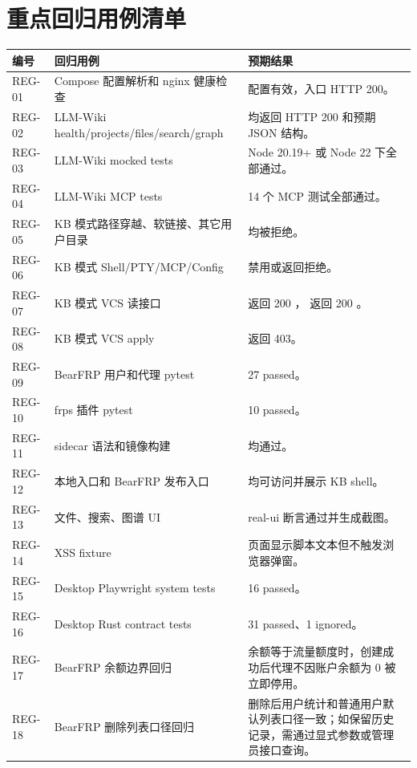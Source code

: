 \documentclass[UTF8,a4paper,12pt,fontset=fandol]{ctexart}
\newcommand{\code}[1]{\texttt{\footnotesize\detokenize{#1}}}
\begin{document}
\section{重点回归用例清单}
\begin{longtable}{p{1.6cm}p{6.0cm}p{6.8cm}}
\toprule
编号 & 回归用例 & 预期结果 \\
\midrule
REG-01 & Compose 配置解析和 nginx 健康检查 & 配置有效，入口 HTTP 200。 \\
REG-02 & LLM-Wiki health/projects/files/search/graph & 均返回 HTTP 200 和预期 JSON 结构。 \\
REG-03 & LLM-Wiki mocked tests & Node 20.19+ 或 Node 22 下全部通过。 \\
REG-04 & LLM-Wiki MCP tests & 14 个 MCP 测试全部通过。 \\
REG-05 & KB 模式路径穿越、软链接、其它用户目录 & 均被拒绝。 \\
REG-06 & KB 模式 Shell/PTY/MCP/Config & 禁用或返回拒绝。 \\
REG-07 & KB 模式 VCS 读接口 & \code{/vcs} 返回 200 \code{\{\}}，\code{/vcs/diff} 返回 200 \code{[]}。 \\
REG-08 & KB 模式 VCS apply & 返回 403。 \\
REG-09 & BearFRP 用户和代理 pytest & 27 passed。 \\
REG-10 & frps 插件 pytest & 10 passed。 \\
REG-11 & sidecar 语法和镜像构建 & 均通过。 \\
REG-12 & 本地入口和 BearFRP 发布入口 & 均可访问并展示 KB shell。 \\
REG-13 & \code{/llm-wiki} 文件、搜索、图谱 UI & real-ui 断言通过并生成截图。 \\
REG-14 & XSS fixture & 页面显示脚本文本但不触发浏览器弹窗。 \\
REG-15 & Desktop Playwright system tests & 16 passed。 \\
REG-16 & Desktop Rust contract tests & 31 passed、1 ignored。 \\
REG-17 & BearFRP 余额边界回归 & 余额等于流量额度时，创建成功后代理不因账户余额为 0 被立即停用。 \\
REG-18 & BearFRP 删除列表口径回归 & 删除后用户统计和普通用户默认列表口径一致；如保留历史记录，需通过显式参数或管理员接口查询。 \\
\bottomrule
\end{longtable}
\end{document}
